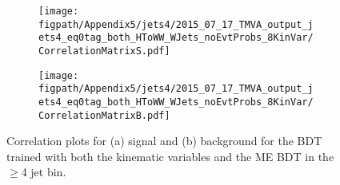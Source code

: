 \begin{figure}[!hbt]
    \centering
    \begin{subfigure}[t]{0.48\textwidth}
        \texttt{[image: \\figpath/Appendix5/jets4/2015\_07\_17\_TMVA\_output\_jets4\_eq0tag\_both\_HToWW\_WJets\_noEvtProbs\_8KinVar/CorrelationMatrixS.pdf]}
        \caption{}
        \label{fig:KinMEBDT_jets4_CorrelationS}
    \end{subfigure}
    \begin{subfigure}[t]{0.48\textwidth}
        \texttt{[image: \\figpath/Appendix5/jets4/2015\_07\_17\_TMVA\_output\_jets4\_eq0tag\_both\_HToWW\_WJets\_noEvtProbs\_8KinVar/CorrelationMatrixB.pdf]}
        \caption{}
        \label{fig:KinMEBDT_jets4_CorrelationB}
    \end{subfigure}
    \caption{Correlation plots for (a) signal and (b) background for the BDT trained with both the kinematic variables and the ME BDT in the $\geqslant$4 jet bin.}
    \label{fig:KinMEBDT_jets4_Correlations}
\end{figure}
\clearpage







